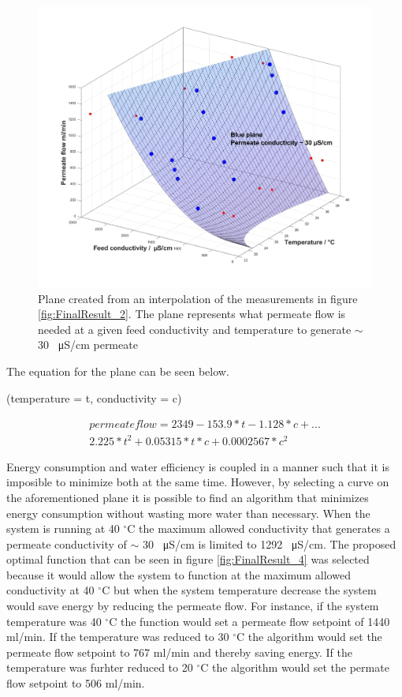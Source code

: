 \begin{figure}[H]
    \centering
    \includegraphics[width=1.1\textwidth]{FinalResult_3}
    \caption{Plane created from an interpolation of the measurements in figure \ref{fig:FinalResult_2}. The plane represents what permeate flow is needed at a given feed conductivity and temperature to generate  $\sim$ 30 \SI{}{\micro\siemens}/cm permeate}
    \label{fig:FinalResult_3}
\end{figure}

The equation for the plane can be seen below.

(temperature = t, conductivity = c)

\begin{multline}
 permeate flow =  2349-153.9*t-1.128*c+...\\
2.225*t^2+0.05315*t*c+0.0002567*c^2
\end{multline}

\newpage





Energy consumption and water efficiency is coupled in a manner such that it is imposible to minimize both at the same time. However, by selecting a curve on the aforementioned plane it is possible to find an algorithm that minimizes energy consumption without wasting more water than necessary. When the system is running at 40 $^{\circ}$C the maximum allowed conductivity that generates a permeate conductivity of  $\sim$ 30 \SI{}{\micro\siemens}/cm is limited to 1292 \SI{}{\micro\siemens}/cm. The proposed optimal function that can be seen in figure \ref{fig:FinalResult_4} was selected because it would allow the system to function at the maximum allowed conductivity at 40 $^{\circ}$C but when the system temperature decrease the system would save energy by reducing the permeate flow. For instance, if the system temperature was 40 $^{\circ}$C the function would set a permeate flow setpoint of 1440 ml/min. If the temperature was reduced to 30 $^{\circ}$C the algorithm would set the permeate flow setpoint to 767 ml/min and thereby saving energy. If the temperature was furhter reduced to 20 $^{\circ}$C the algorithm would set the permate flow setpoint to 506 ml/min. 


